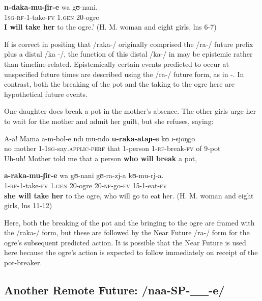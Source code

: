 \documentclass[output=paper]{langsci/langscibook}
\begin{document}
\gll \textbf{n-daka-mu-ʃir-e}   wa   gʊ-nani. \\
\textsc{1sg-rf-}1-take-\textsc{fv}  1.\textsc{gen}  20-ogre \\
\glt \textbf{I will take her} to the ogre.’ (H. M. woman and eight girls, lns 6-7)
\z

If \citet{Botne1999} is correct in positing that /raka-/ originally comprised the /ra-/ future prefix plus a distal /ka%
%
-/, the function of this distal /ka-/ in  may be epistemic rather than timeline-related. Epistemically certain events predicted to occur at unspecified future times are described using the /ra-/ future form, as in -. In contrast, both the breaking of the pot and the taking to the ogre here are hypothetical future events. 

One daughter does break a pot in the mother’s absence. The other girls urge her to wait for the mother and admit her guilt, but she refuses, saying:

\ea\label{ex:sarvasy:15}
\gll A-a!  Mama    a-m-bol-e      ndɪ   mu-ndo   \textbf{u-raka-ataɲ-e}   kʊ   ɪ-sjoŋgo  \\
no  mother  1-1\textsc{sg}-say\textsc{.applic-perf}  that  1-person  1\textsc{-rf}-break-\textsc{fv}  of  9-pot\\
\glt Uh-uh! Mother told me that a person \textbf{who will break} a pot,

\gll \textbf{a-raka-mu-ʃir-e}   wa   gʊ-nani  gʊ-ra-zj-a  kʊ-mu-rj-a.\\
1\textsc{-rf-}1-take-\textsc{fv}    1.\textsc{gen}  20-ogre  20-\textsc{nf}-go-\textsc{fv}  15-1-eat-\textsc{fv} \\
\glt \textbf{she will take her} to the ogre, who will go to eat her. (H. M. woman and eight girls, lns 11-12)
\z

Here, both the breaking of the pot and the bringing to the ogre are framed with the /raka-/ form, but these are followed by the Near Future /ra-/ form for the ogre’s subsequent predicted action. It is possible that the Near Future is used here because the ogre’s action is expected to follow immediately on receipt of the pot-breaker.

\subsection{Another Remote Future: /naa-SP-\_\_-e/}\label{sec:sarvasy:6.2}
\end{document}
